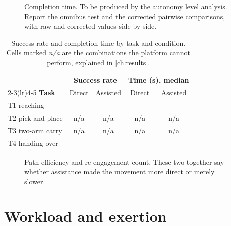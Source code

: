 \begin{figure}[htbp]
  \centering
  \caption[Completion time]{Completion time. To be produced by the autonomy
  level analysis. Report the omnibus test and the corrected pairwise
  comparisons, with raw and corrected values side by side.}
  \label{fig:completion}
\end{figure}

\begin{table}[htbp]
  \centering
  \small
  \caption[Task outcomes]{Success rate and completion time by task and
  condition. Cells marked \emph{n/a} are the combinations the platform cannot
  perform, explained in \cref{ch:results}.}
  \label{tab:outcomes}
  \begin{tabular}{@{}lcccc@{}}
    \toprule
    & \multicolumn{2}{c}{\textbf{Success rate}} &
      \multicolumn{2}{c}{\textbf{Time (s), median}} \\
    \cmidrule(lr){2-3}\cmidrule(lr){4-5}
    \textbf{Task} & Direct & Assisted & Direct & Assisted \\
    \midrule
    T1 reaching & -- & -- & -- & -- \\
    T2 pick and place & n/a & n/a & n/a & n/a \\
    T3 two-arm carry & n/a & n/a & n/a & n/a \\
    T4 handing over & -- & -- & -- & -- \\
    \bottomrule
  \end{tabular}
\end{table}

\begin{figure}[htbp]
  \centering
  \caption[How the driver worked]{Path efficiency and re-engagement count.
  These two together say whether assistance made the movement more direct or
  merely slower.}
  \label{fig:efficiency}
\end{figure}

\section{Workload and exertion}

